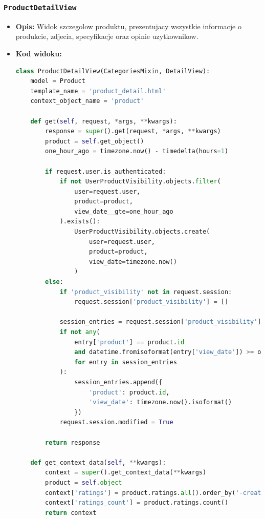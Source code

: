 \documentclass[12pt,a4paper,oneside]{article}
\theoremstyle{definition}
\numberwithin{equation}{section}
\begin{document}
\subsubsection*{\texttt{ProductDetailView}}
    \begin{itemize}
        \item \textbf{Opis:} Widok szczegolow produktu, prezentujacy wszystkie informacje o produkcie, zdjecia, specyfikacje oraz opinie uzytkownikow.
        \item \textbf{Kod widoku:}
        \begin{lstlisting}[language=Python, caption=ProductDetailView]
class ProductDetailView(CategoriesMixin, DetailView):
    model = Product
    template_name = 'product_detail.html'
    context_object_name = 'product'

    def get(self, request, *args, **kwargs):
        response = super().get(request, *args, **kwargs)
        product = self.get_object()
        one_hour_ago = timezone.now() - timedelta(hours=1)

        if request.user.is_authenticated:
            if not UserProductVisibility.objects.filter(
                user=request.user,
                product=product,
                view_date__gte=one_hour_ago
            ).exists():
                UserProductVisibility.objects.create(
                    user=request.user, 
                    product=product, 
                    view_date=timezone.now()
                )
        else:
            if 'product_visibility' not in request.session:
                request.session['product_visibility'] = []

            session_entries = request.session['product_visibility']
            if not any(
                entry['product'] == product.id 
                and datetime.fromisoformat(entry['view_date']) >= one_hour_ago
                for entry in session_entries
            ):
                session_entries.append({
                    'product': product.id,
                    'view_date': timezone.now().isoformat()
                })
            request.session.modified = True

        return response

    def get_context_data(self, **kwargs):
        context = super().get_context_data(**kwargs)
        product = self.object
        context['ratings'] = product.ratings.all().order_by('-created_at')
        context['ratings_count'] = product.ratings.count()
        return context
        \end{lstlisting}


\end{itemize}
\end{document}
